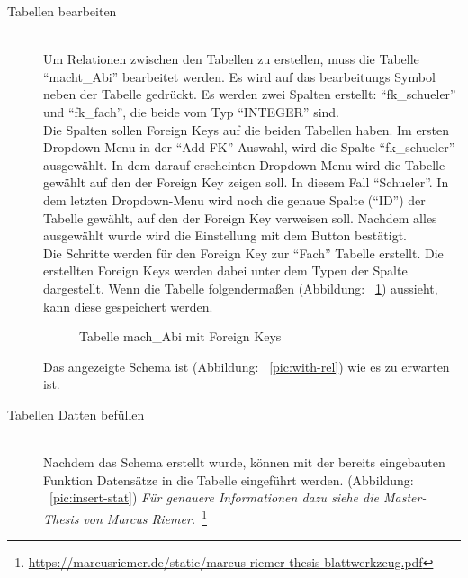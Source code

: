 \begin{description}
\item[Tabellen bearbeiten] \hfill\\
Um Relationen zwischen den Tabellen zu erstellen, muss die Tabelle ``macht\_\-Abi'' bearbeitet werden. Es wird auf das bearbeitungs Symbol neben der Tabelle gedrückt. Es werden zwei Spalten erstellt: ``fk\_\-schueler'' und ``fk\_\-fach'', die beide vom Typ ``INTEGER'' sind. \\
Die Spalten sollen Foreign Keys auf die beiden Tabellen haben. Im ersten Dropdown-Menu in der ``Add FK'' Auswahl, wird die Spalte ``fk\_\-schueler'' ausgewählt. In dem darauf erscheinten Dropdown-Menu wird die Tabelle gewählt auf den der Foreign Key zeigen soll. In diesem Fall ``Schueler''. In dem letzten Dropdown-Menu wird noch die genaue Spalte (``ID'') der Tabelle gewählt, auf den der Foreign Key verweisen soll. Nachdem alles ausgewählt wurde wird die Einstellung mit dem Button bestätigt. \\
Die Schritte werden für den Foreign Key zur ``Fach'' Tabelle erstellt.
Die erstellten Foreign Keys werden dabei unter dem Typen der Spalte dargestellt. Wenn die Tabelle folgendermaßen (Abbildung: ~\ref{pic:editor-fk}) aussieht, kann diese gespeichert werden. 

\begin{figure}[ht]
        \centering
        \caption{Tabelle mach\_Abi mit Foreign Keys}
        \label{pic:editor-fk}
\end{figure}

Das angezeigte Schema ist (Abbildung: ~\ref{pic:with-rel}) wie es zu erwarten ist.

\item[Tabellen Datten befüllen] \hfill\\
Nachdem das Schema erstellt wurde, können mit der bereits eingebauten Funktion Datensätze in die Tabelle eingeführt werden. (Abbildung: ~\ref{pic:insert-stat}) \textit{Für genauere Informationen dazu siehe die Master-Thesis von Marcus Riemer.}~\footnote{\url{https://marcusriemer.de/static/marcus-riemer-thesis-blattwerkzeug.pdf}}


\end{description}
